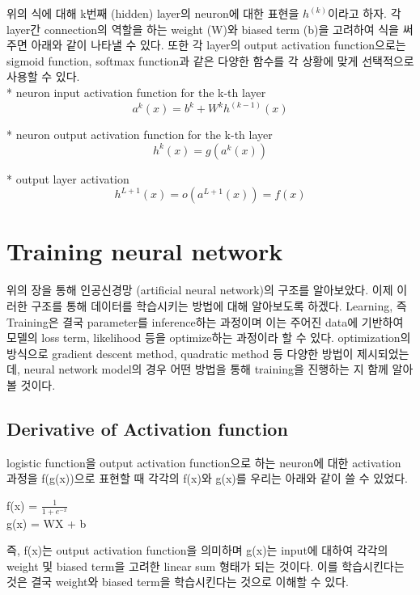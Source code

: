 \documentclass[draft=false]{oblivoir}
\begin{document}
위의 식에 대해 k번째 (hidden) layer의 neuron에 대한 표현을 $h^{(k)}$이라고 하자. 각 layer간 connection의 역할을 하는 weight (W)와 biased term (b)을 고려하여 식을 써주면 아래와 같이 나타낼 수 있다. 또한 각 layer의 output activation function으로는 sigmoid function, softmax function과 같은 다양한 함수를 각 상황에 맞게 선택적으로 사용할 수 있다. \\

* neuron input activation function for the k-th layer
\begin{equation}
a^{k}(x) = b^{k} + W^{k}h^{(k-1)}(x)
\label{eq:14-2-13}
\end{equation}

* neuron output activation function for the k-th layer
\begin{equation}
h^{k}(x) = g(a^{k}(x))
\label{eq:14-2-14}
\end{equation}

* output layer activation
\begin{equation}
h^{L+1}(x) = o(a^{L+1}(x)) = f(x)
\label{eq:14-2-15}
\end{equation}
\section{Training neural network}
위의 장을 통해 인공신경망 (artificial neural network)의 구조를 알아보았다. 이제 이러한 구조를 통해 데이터를 학습시키는 방법에 대해 알아보도록 하겠다. Learning, 즉 Training은 결국 parameter를 inference하는 과정이며 이는 주어진 data에 기반하여 모델의 loss term, likelihood 등을 optimize하는 과정이라 할 수 있다. optimization의 방식으로 gradient descent method, quadratic method 등 다양한 방법이 제시되었는데, neural network model의 경우 어떤 방법을 통해 training을 진행하는 지 함께 알아볼 것이다.
\subsection{Derivative of Activation function}
logistic function을 output activation function으로 하는 neuron에 대한 activation 과정을 f(g(x))으로 표현할 때 각각의 f(x)와 g(x)를 우리는 아래와 같이 쓸 수 있었다. 
\begin{center}
    f(x) = $\frac{1}{1+e^{-x}}$\\
    g(x) = WX + b
\end{center}
즉, f(x)는 output activation function을 의미하며 g(x)는 input에 대하여 각각의 weight 및 biased term을 고려한 linear sum 형태가 되는 것이다. 이를 학습시킨다는 것은 결국 weight와 biased term을 학습시킨다는 것으로 이해할 수 있다. \\
\end{document}
